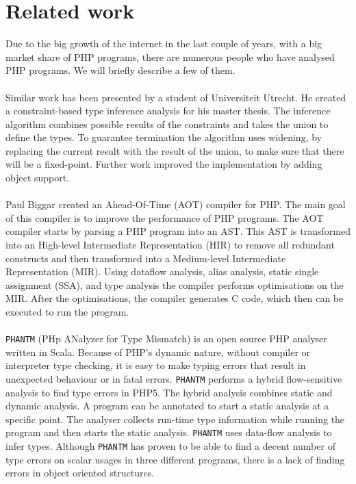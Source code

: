 \documentclass[../main.tex]{subfiles}
\begin{document}
    \section{Related work}\label{sec:background_related-work}    
    Due to the big growth of the internet in the last couple of years, with a big market share of PHP programs, there are numerous people who have analysed PHP programs.
    We will briefly describe a few of them.
    
    \paragraph{}
    Similar work has been presented by a student of Universiteit Utrecht\cite{Cam:07, Cam:09}.
    He created a constraint-based type inference analysis for his master thesis.
    The inference algorithm combines possible results of the constraints and takes the union to define the types.
    To guarantee termination the algorithm uses widening, by replacing the current result with the result of the union, to make sure that there will be a fixed-point.
    Further work improved the implementation by adding object support\cite{Hoe:15}.
    
    \paragraph{}
    Paul Biggar created an Ahead-Of-Time (AOT) compiler for PHP\cite{Big:10}.
    The main goal of this compiler is to improve the performance of PHP programs.
    The AOT compiler starts by parsing a PHP program into an AST.
    This AST is transformed into an High-level Intermediate Representation (HIR) to remove all redundant constructs and then transformed into a Medium-level Intermediate Representation (MIR).
    Using dataflow analysis, alias analysis, static single assignment (SSA), and type analysis the compiler performs optimisations on the MIR.
    After the optimisations, the compiler generates C code, which then can be executed to run the program.
   
    \paragraph{}
    \texttt{PHANTM}\cite{Kne:10,Bar:10} (PHp ANalyzer for Type Mismatch) is an open source PHP analyser written in Scala.
    Because of PHP's dynamic nature, without compiler or interpreter type checking, it is easy to make typing errors that result in unexpected behaviour or in fatal errors.
    \texttt{PHANTM} performs a hybrid flow-sensitive analysis to find type errors in PHP5.
    The hybrid analysis combines static and dynamic analysis.
    A program can be annotated to start a static analysis at a specific point.
    The analyser collects run-time type information while running the program and then starts the static analysis.
    \texttt{PHANTM} uses data-flow analysis to infer types.
    Although \texttt{PHANTM} has proven to be able to find a decent number of type errors on scalar usages in three different programs, there is a lack of finding errors in object oriented structures.
    
\end{document}
